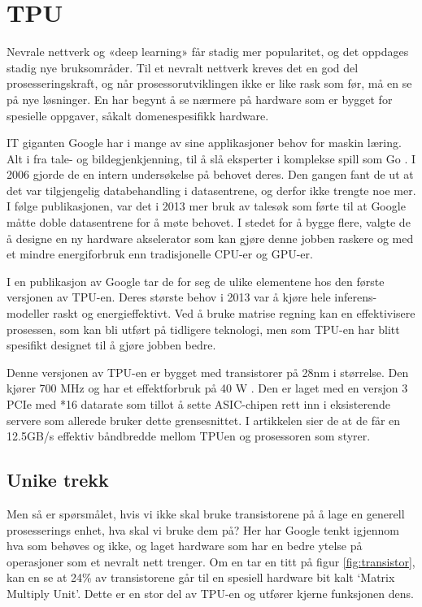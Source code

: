 
\newpage
\section{TPU}
Nevrale nettverk og «deep learning» får stadig mer popularitet, og det oppdages stadig nye bruksområder. Til et nevralt nettverk kreves det en god del prosesseringskraft, og når prosessorutviklingen ikke er like rask som før, må en se på nye løsninger. En har begynt å se nærmere på hardware som er bygget for spesielle oppgaver, såkalt domenespesifikk hardware. 

IT giganten Google har i mange av sine applikasjoner behov for maskin læring. Alt i fra tale- og bildegjenkjenning, til å slå eksperter i komplekse spill som Go \cite{look_at_TPU}. I 2006 gjorde de en intern undersøkelse på behovet deres. Den gangen fant de ut at det var tilgjengelig databehandling i datasentrene, og derfor ikke trengte noe mer. I følge publikasjonen, var det i 2013 mer bruk av talesøk som førte til at Google måtte doble datasentrene for å møte behovet. I stedet for å bygge flere, valgte de å designe en ny hardware akselerator som kan gjøre denne jobben raskere og med et mindre energiforbruk enn tradisjonelle CPU-er og GPU-er.

I en publikasjon av Google \cite{tpu_main} tar de for seg de ulike elementene hos den første versjonen av TPU-en. Deres største behov i 2013 var å kjøre hele inferens-modeller raskt og energieffektivt. Ved å bruke matrise regning kan en effektivisere prosessen, som kan bli utført på tidligere teknologi, men som TPU-en har blitt spesifikt designet til å gjøre jobben bedre.

Denne versjonen av TPU-en er bygget med transistorer på 28nm i størrelse. Den kjører 700 MHz og har et effektforbruk på 40 W \cite{tpu_main}. Den er laget med en versjon 3 PCIe med *16 datarate som tillot å sette ASIC-chipen rett inn i eksisterende servere som allerede bruker dette grensesnittet. I artikkelen sier de at de får en 12.5GB/s effektiv båndbredde mellom TPUen og prosessoren som styrer.
 
\subsection{Unike trekk}
Men så er spørsmålet, hvis vi ikke skal bruke transistorene på å lage en generell prosesserings enhet, hva skal vi bruke dem på? Her har Google tenkt igjennom hva som behøves og ikke, og laget hardware som har en bedre ytelse på operasjoner som et nevralt nett trenger. Om en tar en titt på figur \ref{fig:transistor}, kan en se at 24\% av transistorene går til en spesiell hardware bit kalt ‘Matrix Multiply Unit’. Dette er en stor del av TPU-en og utfører kjerne funksjonen dens.


